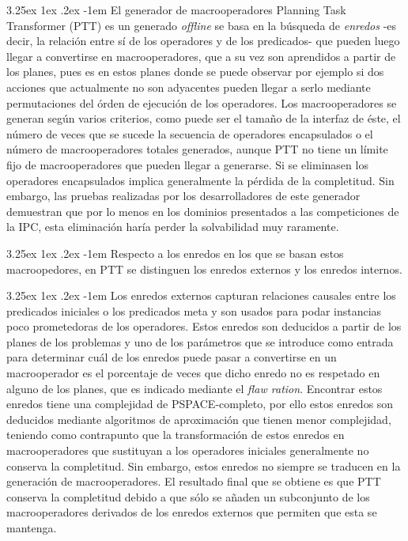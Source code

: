 \documentclass{article}
\makeatletter
\newcommand{\comment}[1]{}
\newcounter{subsubsubsection}
\renewcommand\paragraph{\@startsection{paragraph}{5}{\z@}%
  {3.25ex \@plus1ex \@minus.2ex}%
  {-1em}%
  {\normalfont\normalsize\bfseries}}
\makeatother
\begin{document}
\comment{Incluir definición de generadores de macros online y offline}

\paragraph{}
El generador de macrooperadores Planning Task Transformer (PTT) es un generado \textit{offline} se basa en la búsqueda de \textit{enredos}\comment{entanglements} -es decir, la relación entre sí de los operadores y de los predicados- que pueden luego llegar a convertirse en macrooperadores, que a su vez son aprendidos a partir de los planes, pues es en estos planes donde se puede observar por ejemplo si dos acciones que actualmente no son adyacentes pueden llegar a serlo mediante permutaciones del órden de ejecución de los operadores. Los macrooperadores se generan según varios criterios, como puede ser el tamaño de la interfaz de éste, el número de veces que se sucede la secuencia de operadores encapsulados o el número de macrooperadores totales generados, aunque PTT no tiene un límite fijo de macrooperadores que pueden llegar a generarse. Si se eliminasen los operadores encapsulados implica generalmente la pérdida de la completitud. Sin embargo, las pruebas realizadas por los desarrolladores de este generador demuestran que por lo menos en los dominios presentados a las competiciones de la IPC, esta eliminación haría perder la solvabilidad muy raramente.

\paragraph{}
Respecto a los enredos en los que se basan estos macroopedores, en PTT se distinguen los enredos externos y los enredos internos.

\paragraph{}
Los enredos externos capturan relaciones causales entre los predicados iniciales o los predicados meta y son usados para podar instancias poco prometedoras de los operadores. Estos enredos son deducidos a partir de los planes de los problemas y uno de los parámetros que se introduce como entrada para determinar cuál de los enredos puede pasar a convertirse en un macrooperador es el porcentaje de veces que dicho enredo no es respetado en alguno de los planes, que es indicado mediante el \textit{flaw ration}. Encontrar estos enredos tiene una complejidad de PSPACE-completo, por ello estos enredos son deducidos mediante algoritmos de aproximación que tienen menor complejidad, teniendo como contrapunto que la transformación de estos enredos en macrooperadores que sustituyan a los operadores iniciales generalmente no conserva la completitud. Sin embargo, estos enredos no siempre se traducen en la generación de macrooperadores. El resultado final que se obtiene es que PTT conserva la completitud debido a que sólo se añaden un subconjunto de los macrooperadores derivados de los enredos externos que permiten que esta se mantenga.
\end{document}
